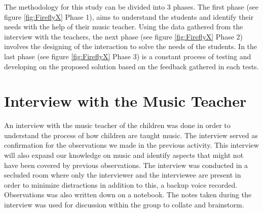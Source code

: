 The methodology for this study can be divided into 3 phases. The first phase (see figure \ref{fig:FireflyX} Phase 1), aims to understand the students and identify their needs with the help of their music teacher. Using the data gathered from the interview with the teachers, the next phase (see figure \ref{fig:FireflyX} Phase 2) involves the designing of the interaction to solve the needs of the students. In the last phase (see figure \ref{fig:FireflyX} Phase 3) is a constant process of testing and developing on the proposed solution based on the feedback gathered in each tests.


\section{Interview with the Music Teacher}
An interview with the music teacher of the children was done in order to understand the process of how children are taught music. The interview served as confirmation for the observations we made in the previous activity. This interview will also expand our knowledge on music and identify aspects that might not have been covered by previous observations. The interview was conducted in a secluded room where only the interviewer and the interviewee are present in order to minimize distractions in addition to this, a backup voice recorded. Observations was also written down on a notebook. The notes taken during the interview was used for discussion within the group to collate and brainstorm.


